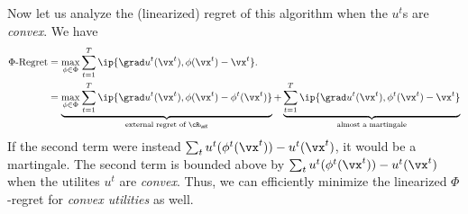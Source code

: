 
Now let us analyze the (linearized) regret of this algorithm when the $u^t$s are {\em convex}. We have
\begin{align}
    \Phi\text{-Regret} &= \max_{\phi\in\Phi} \sum_{t=1}^T \ip{\grad u^t(\vx^t), \phi(\vx^t) - \vx^t}.
    \\&=\underbrace{\max_{\phi\in\Phi} \sum_{t=1}^T \ip{\grad u^t(\vx^t), \phi(\vx^t) - \phi^t(\vx^t)}}_{\text{external regret of $\cR_\mK$}} + \underbrace{\sum_{t=1}^T \ip{\grad u^t(\vx^t), \phi^t(\vx^t) - \vx^t}}_\text{almost a martingale}
\end{align}
If the second term were instead $\sum_t u^t(\phi^t(\vx^t)) - u^t(\vx^t)$, it would be a martingale. The second term is bounded above by $\sum_t u^t(\phi^t(\vx^t)) - u^t(\vx^t)$ when the utilites $u^t$ are {\em convex}. Thus, we can efficiently minimize the linearized $\Phi$-regret for {\em convex utilities} as well. 

